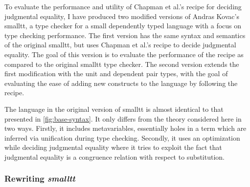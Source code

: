 \documentclass{article}
\begin{document}
% 

To evaluate the performance and utility of Chapman et al.'s recipe for deciding judgmental equality, I have produced two modified versions of Andras Kovac's smalltt, a type checker for a small dependently typed language with a focus on type checking performance.
The first version has the same syntax and semantics of the original smalltt, but uses Chapman et al.'s recipe to decide judgmental equality.
The goal of this version is to evaluate the performance of the recipe as compared to the original smalltt type checker.
The second version extends the first modification with the unit and dependent pair types, with the goal of evaluating the ease of adding new constructs to the language by following the recipe.

The language in the original version of smalltt is almost identical to that presented in \autoref{fig:base-syntax}.
It only differs from the theory considered here in two ways.
Firstly, it includes metavariables, essentially holes in a term which are inferred via unification during type checking.
Secondly, it uses an optimization while deciding judgmental equality where it tries to exploit the fact that judgmental equality is a congruence relation with respect to substitution.


\subsubsection{Rewriting \textit{smalltt}}
\end{document}
